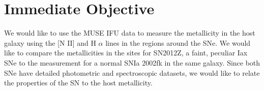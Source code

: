 \section{Immediate Objective}
We would like to use the MUSE IFU data to measure the metallicity in the host galaxy using the [N II] and H $\alpha$ lines in the regions around the SNe. We would like to compare the metallicities in the sites for SN2012Z, a faint, peculiar Iax SNe to the measurement for a normal SNIa 2002fk in the same galaxy. Since both SNe have detailed photometric and spectroscopic datasets, we would like to relate the properties of the SN to the host metallicity. 